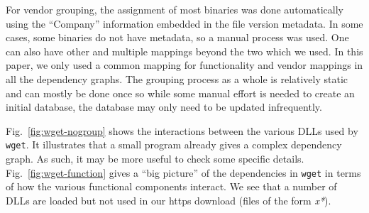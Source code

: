 For vendor grouping, the assignment of most binaries was done automatically
using the ``Company'' information embedded in the file version metadata.
In some cases, some binaries do not have metadata, so a manual process
was used.
One can also have other and multiple mappings beyond the two which we used.
In this paper, we only used a 
common mapping for functionality and vendor mappings 
in all the dependency graphs.
The grouping process as a whole is relatively static and can mostly be
done once so while some manual effort is needed to create an initial
database, the database may only need to be updated infrequently.

Fig.~\ref{fig:wget-nogroup} shows the interactions
between the various DLLs used by {\tt wget}.
It illustrates that a small program already
gives a complex dependency graph.
As such, it may be more useful to check some specific details.
Fig.~\ref{fig:wget-function} gives
a ``big picture'' of the dependencies
in {\tt wget} in terms of how the various functional
components interact.
We see that a number of DLLs are loaded but not used in our https download
(files of the form {\it *x*}).


